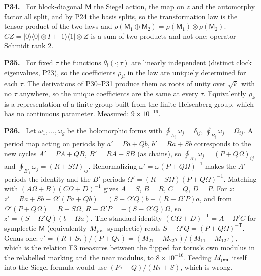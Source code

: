 \documentclass[11pt]{article}
\newenvironment{solution}[1]{\medskip\noindent\textbf{P#1.}\ }{\par\medskip}
\begin{document}
\begin{solution}{34}
For block-diagonal $\mathsf M$ the Siegel action, the map on $z$ and the automorphy
factor all split, and by P24 the basis splits, so the transformation law is
the tensor product of the two laws and $\rho(\mathsf M_1\oplus\mathsf M_2) = \rho(\mathsf M_1)\otimes\rho(\mathsf M_2)$.
$CZ = |0\rangle\langle0|\otimes I + |1\rangle\langle1|\otimes Z$ is a sum of two
products and not one: operator Schmidt rank $2$.
\end{solution}

\begin{solution}{35}
For fixed $\tau$ the functions $\theta_l(\cdot;\tau)$ are linearly independent
(distinct clock eigenvalues, P23), so the coefficients $\rho_{jl}$ in the law
are uniquely determined for each $\tau$. The derivations of P30--P31 produce
them as roots of unity over $\sqrt k$ with no $\tau$ anywhere, so the unique
coefficients are the same at every $\tau$. Equivalently $\rho_k$ is a
representation of a finite group built from the finite Heisenberg group,
which has no continuous parameter. Measured: $9\times10^{-16}$.
\end{solution}

\begin{solution}{36}
Let $\omega_1,\dots,\omega_g$ be the holomorphic forms with $\oint_{A_i}\omega_j = \delta_{ij}$,
$\oint_{B_i}\omega_j = \Omega_{ij}$. A period map acting on periods by
$a' = Pa+Qb$, $b' = Ra+Sb$ corresponds to the new cycles $A' = PA+QB$,
$B' = RA+SB$ (as chains), so $\oint_{A'_i}\omega_j = (P+Q\Omega)_{ij}$ and
$\oint_{B'_i}\omega_j = (R+S\Omega)_{ij}$. Renormalizing $\omega' = \omega(P+Q\Omega)^{-1}$
makes the $A'$-periods the identity and the $B'$-periods
$\Omega' = (R+S\Omega)(P+Q\Omega)^{-1}$. Matching with $(A\Omega+B)(C\Omega+D)^{-1}$
gives $A = S$, $B = R$, $C = Q$, $D = P$. For $z$: $z' = Ra+Sb-\Omega'(Pa+Qb)
= (S-\Omega'Q)b+(R-\Omega'P)a$, and from $\Omega'(P+Q\Omega) = R+S\Omega$,
$R-\Omega'P = -(S-\Omega'Q)\Omega$, so $z' = (S-\Omega'Q)(b-\Omega a)$. The
standard identity $(C\Omega+D)^{-\mathsf T} = A-\Omega'C$ for symplectic
$\mathsf M$ (equivalently $M_{\rm per}$ symplectic) reads $S-\Omega'Q = (P+Q\Omega)^{-\mathsf T}$.
Genus one: $\tau' = (R+S\tau)/(P+Q\tau) = (M_{21}+M_{22}\tau)/(M_{11}+M_{12}\tau)$,
which is the relation F3 measures between the flipped far torus's own modulus
in the relabelled marking and the near modulus, to $8\times10^{-16}$. Feeding
$M_{\rm per}$ itself into the Siegel formula would use $(P\tau+Q)/(R\tau+S)$,
which is wrong.
\end{solution}
\end{document}
